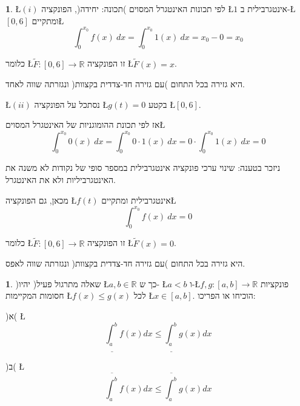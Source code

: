\documentclass[english,hebrew]{article}
\theoremstyle{plain}
\theoremstyle{definition}
\newtheorem{xca}[thm]{\protect\exercisename}
\theoremstyle{definition}
\newtheorem*{sol*}{\protect\solutionname}
\providecommand{\exercisename}{תרגיל}
\providecommand{\solutionname}{פתרון}
\begin{document}
\begin{sol*}
\L{$\left(i\right)$} לפי תכונות האינטגרל המסוים )תכונה: יחידה(, הפונקציה
\L{$1$} אינטגרבילית ב-\L{$\left[0,6\right]$} ומתקיים\L{%
\[
\int_{0}^{x_{0}}f(x)\ dx=\int_{0}^{x_{0}}1(x)\ dx=x_{0}-0=x_{0}
\]
}%

כלומר \L{$\tilde{F}:\left[0,6\right]\rightarrow\mathbb{R}$} זו הפונקציה
\L{$\tilde{F}\left(x\right)=x$}.

היא גזירה בכל התחום )עם גזירה חד-צדדית בקצוות( ונגזרתה שווה לאחד.

\L{$\left(ii\right)$} נסתכל על הפונקציה \L{$g(t)=0$} בקטע \L{$\left[0,6\right]$}.

אז לפי תכונת ההומוגניות של האינטגרל המסוים\L{%
\[
\int_{0}^{x_{0}}0(x)\ dx=\int_{0}^{x_{0}}0\cdot1(x)\ dx=0\cdot\int_{0}^{x_{0}}1(x)\ dx=0
\]
}%

ניזכר בטענה: שינוי ערכי פונקציה אינטגרבילית במספר סופי של נקודות לא
משנה את האינטגרביליות ולא את האינטגרל.

מכאן, גם הפונקציה \L{$f(t)$} אינטגרבילית ומתקיים\L{%
\[
\int_{0}^{x_{0}}f(x)\ dx=0
\]
}%

כלומר \L{$\tilde{F}:\left[0,6\right]\rightarrow\mathbb{R}$} זו הפונקציה
\L{$\tilde{F}\left(x\right)=0$}.

היא גזירה בכל התחום )עם גזירה חד-צדדית בקצוות( ונגזרתה שווה לאפס.
\end{sol*}
\begin{xca}
)שאלה מתרגול פעיל( יהיו \L{$a,b\in\mathbb{R}$} כך ש- \L{$a<b$} ו-\L{$f,g:[a,b]\to\mathbb{R}$}
פונקציות חסומות המקיימות \L{$f(x)\le g(x)$} לכל \L{$x\in[a,b]$}.
הוכיחו או הפריכו:

)א( \L{%
\[
\underline{\int_{a}^{b}}f(x)dx\le\underline{\int_{a}^{b}}g(x)dx
\]
}%

)ב( \L{%
\[
\overline{\int_{a}^{b}}f(x)dx\le\overline{\int_{a}^{b}}g(x)dx
\]
}%
\end{xca}
\end{document}
